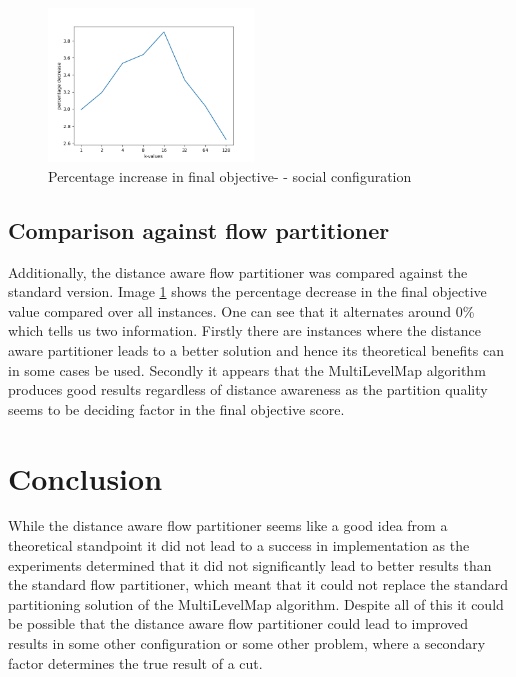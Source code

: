 \documentclass[acmsmall,nonacm,screen,review]{acmart}
\begin{document}
\begin{figure}[b]
  \centering
  \includegraphics[width=0.485\textwidth]{images/perctentage_increase_finalobjective_social_vanialla_vs_improved.png}
  \caption{Percentage increase in final objective-  - social configuration}
  \label{fig:comp_flows}
\end{figure}

\subsection{Comparison against flow partitioner}
Additionally, the distance aware flow partitioner was compared against the standard version. Image \ref{fig:comp_flows} shows
the percentage decrease in the final objective value compared over all instances. One can see that it alternates
around 0\% which tells us two information. Firstly there are instances where the distance aware partitioner leads
to a better solution and hence its theoretical benefits can in some cases be used. Secondly it appears that
the MultiLevelMap algorithm produces good results regardless of distance awareness as the partition quality seems
to be deciding factor in the final objective score. 

\section{Conclusion}
While the distance aware flow partitioner seems like a good idea from a theoretical standpoint
it did not lead to a success in implementation as the experiments determined that it did not significantly
lead to better results than the standard flow partitioner, which meant that it could not replace 
the standard partitioning solution of the MultiLevelMap algorithm. Despite all of this it could be possible
that the distance aware flow partitioner could lead to improved results in some other configuration or 
some other problem, where a secondary factor determines the true result of a cut. 




\end{document}
